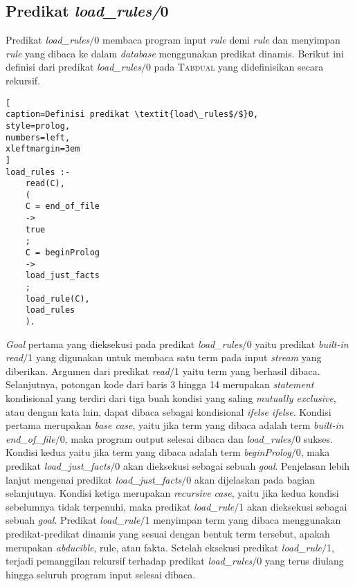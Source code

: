 \subsection{Predikat \textit{load\_rules/}0}

Predikat \textit{load\_rules$/$}0 membaca program input \textit{rule} demi \textit{rule} dan menyimpan \textit{rule} yang dibaca ke dalam \textit{database} menggunakan predikat dinamis. Berikut ini definisi dari predikat \textit{load\_rules$/$}0 pada \textsc{Tabdual} yang didefinisikan secara rekursif.
\\

\begin{lstlisting}[
caption=Definisi predikat \textit{load\_rules$/$}0,
style=prolog,
numbers=left,
xleftmargin=3em
]
load_rules :-
	read(C),
	(
	C = end_of_file 
	-> 
	true
	;
	C = beginProlog
	->
	load_just_facts
	;
	load_rule(C), 
	load_rules
	).
\end{lstlisting}

\textit{Goal} pertama yang dieksekusi pada predikat \textit{load\_rules$/$}0  yaitu predikat \textit{built-in} \textit{read$/$}1 yang digunakan untuk membaca satu term pada input \textit{stream} yang diberikan. Argumen dari predikat \textit{read$/$}1 yaitu term yang berhasil dibaca. Selanjutnya, potongan kode dari baris 3 hingga 14 merupakan \textit{statement} kondisional yang terdiri dari tiga buah kondisi yang saling \textit{mutually exclusive}, atau dengan kata lain, dapat dibaca sebagai kondisional \textit{if\textendash else if\textendash else}. Kondisi pertama merupakan \textit{base case}, yaitu jika term yang dibaca adalah term \textit{built-in end\_of\_file$/$}0, maka program output selesai dibaca dan \textit{load\_rules$/$}0 sukses. Kondisi kedua yaitu jika term yang dibaca adalah term \textit{beginProlog$/$}0, maka predikat \textit{load\_just\_facts$/$}0 akan dieksekusi sebagai sebuah \textit{goal}. Penjelasan lebih lanjut mengenai predikat \textit{load\_just\_facts$/$}0 akan dijelaskan pada bagian selanjutnya. Kondisi ketiga merupakan \textit{recursive case}, yaitu jika kedua kondisi sebelumnya tidak terpenuhi, maka predikat \textit{load\_rule$/$}1 akan dieksekusi sebagai sebuah \textit{goal}. Predikat \textit{load\_rule$/$}1 menyimpan term yang dibaca menggunakan predikat-predikat dinamis yang sesuai dengan bentuk term tersebut, apakah merupakan \textit{abducible}, rule, atau fakta. Setelah eksekusi predikat \textit{load\_rule$/$}1, terjadi pemanggilan rekursif terhadap predikat \textit{load\_rules$/$}0 yang terus diulang hingga seluruh program input selesai dibaca.

